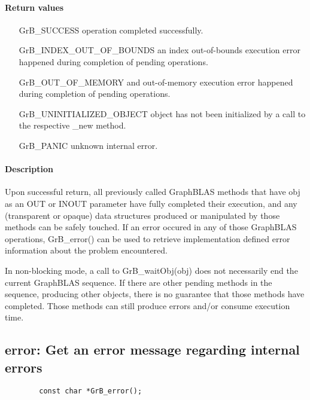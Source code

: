 \paragraph{Return values}
\begin{itemize}[leftmargin=2.3in]
	\item[{\sf GrB\_SUCCESS}]			operation completed successfully.
	\item[{\sf GrB\_INDEX\_OUT\_OF\_BOUNDS}]	an index out-of-bounds execution error happened during completion of pending operations.
	\item[{\sf GrB\_OUT\_OF\_MEMORY}]		and out-of-memory execution error happened during completion of pending operations.
	\item[{\sf GrB\_UNINITIALIZED\_OBJECT}]		object has not been initialized by a call to the respective {\sf *\_new} method.
	\item[{\sf GrB\_PANIC}]				unknown internal error.
\end{itemize}

\paragraph{Description}

Upon successful return, all previously called GraphBLAS methods that
have {\sf obj} as an {\sf OUT} or {\sf INOUT} parameter have fully
completed their execution, and any (transparent or opaque) data structures
produced or manipulated by those methods can be safely touched.  If an
error occured in any of those GraphBLAS operations, {\sf GrB\_error()}
can be used to retrieve implementation defined error information about
the problem encountered.

In non-blocking mode, a call to {\sf GrB\_waitObj(obj)} does not necessarily
end the current GraphBLAS sequence. If there are other pending methods
in the sequence, producing other objects, there is no guarantee that
those methods have completed. Those methods can still produce errors
and/or consume execution time.

\subsection{{\sf error}: Get an error message regarding internal errors}

\begin{verbatim}
        const char *GrB_error();
\end{verbatim}

